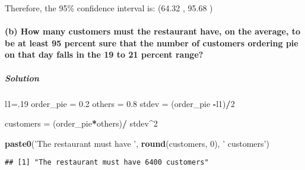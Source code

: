 \documentclass[]{article}
\newenvironment{Shaded}{\begin{snugshade}}{\end{snugshade}}
\newcommand{\DecValTok}[1]{\textcolor[rgb]{0.00,0.00,0.81}{#1}}
\newcommand{\FloatTok}[1]{\textcolor[rgb]{0.00,0.00,0.81}{#1}}
\newcommand{\KeywordTok}[1]{\textcolor[rgb]{0.13,0.29,0.53}{\textbf{#1}}}
\newcommand{\NormalTok}[1]{#1}
\newcommand{\OperatorTok}[1]{\textcolor[rgb]{0.81,0.36,0.00}{\textbf{#1}}}
\newcommand{\StringTok}[1]{\textcolor[rgb]{0.31,0.60,0.02}{#1}}
\let\oldparagraph\paragraph
\renewcommand{\paragraph}[1]{\oldparagraph{#1}\mbox{}}
\let\oldsubparagraph\subparagraph
\renewcommand{\subparagraph}[1]{\oldsubparagraph{#1}\mbox{}}
\begin{document}
Therefore, the 95\% confidence interval is: (64.32 , 95.68 )

\hypertarget{b-how-many-customers-must-the-restaurant-have-on-the-average-to-be-at-least-95-percent-sure-that-the-number-of-customers-ordering-pie-on-that-day-falls-in-the-19-to-21-percent-range}{%
\paragraph{(b) How many customers must the restaurant have, on the
average, to be at least 95 percent sure that the number of customers
ordering pie on that day falls in the 19 to 21 percent
range?}\label{b-how-many-customers-must-the-restaurant-have-on-the-average-to-be-at-least-95-percent-sure-that-the-number-of-customers-ordering-pie-on-that-day-falls-in-the-19-to-21-percent-range}}

\hypertarget{solution-1}{%
\subparagraph{Solution}\label{solution-1}}

\begin{Shaded}
\begin{Highlighting}[]
\NormalTok{l1=.}\DecValTok{19}
\NormalTok{order_pie =}\StringTok{ }\FloatTok{0.2}
\NormalTok{others =}\StringTok{ }\FloatTok{0.8}
\NormalTok{stdev =}\StringTok{ }\NormalTok{(order_pie }\OperatorTok{-}\NormalTok{l1)}\OperatorTok{/}\DecValTok{2}

\NormalTok{customers =}\StringTok{ }\NormalTok{(order_pie}\OperatorTok{*}\NormalTok{others)}\OperatorTok{/}\StringTok{ }\NormalTok{stdev}\OperatorTok{^}\DecValTok{2}

\KeywordTok{paste0}\NormalTok{(}\StringTok{'The restaurant must have '}\NormalTok{, }\KeywordTok{round}\NormalTok{(customers, }\DecValTok{0}\NormalTok{), }\StringTok{' customers'}\NormalTok{)}
\end{Highlighting}
\end{Shaded}

\begin{verbatim}
## [1] "The restaurant must have 6400 customers"
\end{verbatim}
\end{document}
